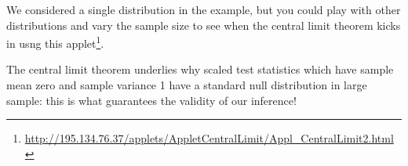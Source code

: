 \documentclass[
  11pt,
  letterpaper,
]{book}
\renewcommand{\href}[2]{#2\footnote{\url{#1}}}
\theoremstyle{definition}
\theoremstyle{definition}
\theoremstyle{definition}
\theoremstyle{remark}
\begin{document}
We considered a single distribution in the example, but you could play with other distributions and vary the sample size to see when the central limit theorem kicks in usng this \href{http://195.134.76.37/applets/AppletCentralLimit/Appl_CentralLimit2.html}{applet}.

The central limit theorem underlies why scaled test statistics which have sample mean zero and sample variance 1 have a standard null distribution in large sample: this is what guarantees the validity of our inference!

  
\end{document}
